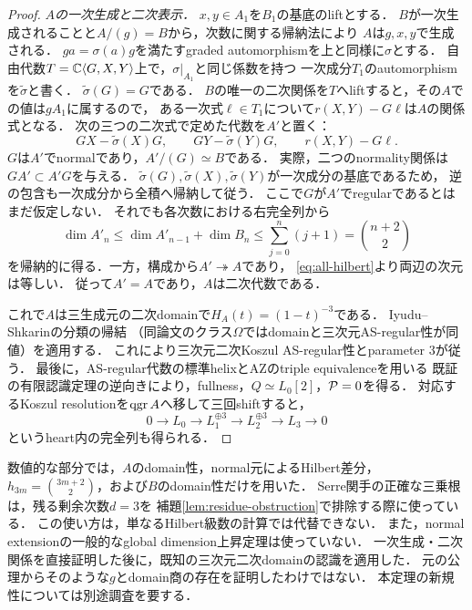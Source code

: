 \documentclass[11pt,a4paper]{ltjsarticle}
\begin{document}
\begin{proof}
\emph{$A$の一次生成と二次表示．}
$x,y\in A_1$を$B_1$の基底のliftとする．
$B$が一次生成されることと$A/(g)=B$から，次数に関する帰納法により
$A$は$g,x,y$で生成される．
$ga=\sigma(a)g$を満たすgraded automorphismを上と同様に$\sigma$とする．
自由代数$T=\mathbb C\langle G,X,Y\rangle$上で，$\sigma|_{A_1}$と同じ係数を持つ
一次成分$T_1$のautomorphismを$\widetilde\sigma$と書く．
$\widetilde\sigma(G)=G$である．
$B$の唯一の二次関係を$T$へliftすると，その$A$での値は$gA_1$に属するので，
ある一次式$\ell\in T_1$について$r(X,Y)-G\ell$は$A$の関係式となる．
次の三つの二次式で定めた代数を$A'$と置く：
\[
 GX-\widetilde\sigma(X)G,\qquad
 GY-\widetilde\sigma(Y)G,\qquad
 r(X,Y)-G\ell.
\]
$G$は$A'$でnormalであり，$A'/(G)\simeq B$である．
実際，二つのnormality関係は$GA'\subset A'G$を与える．
$\widetilde\sigma(G),\widetilde\sigma(X),\widetilde\sigma(Y)$が一次成分の基底であるため，
逆の包含も一次成分から全積へ帰納して従う．
ここで$G$が$A'$でregularであるとはまだ仮定しない．
それでも各次数における右完全列から
\[
 \dim A'_n\leq\dim A'_{n-1}+\dim B_n
 \leq\sum_{j=0}^n(j+1)=\binom{n+2}{2}
\]
を帰納的に得る．一方，構成から$A'\twoheadrightarrow A$であり，
\eqref{eq:all-hilbert}より両辺の次元は等しい．
従って$A'=A$であり，$A$は二次代数である．

これで$A$は三生成元の二次domainで$H_A(t)=(1-t)^{-3}$である．
Iyudu--Shkarin\cite[\S12.1, p.~78]{IS}の分類の帰結
（同論文のクラス$\Omega$ではdomainと三次元AS-regular性が同値）を適用する．
これにより三次元二次Koszul AS-regular性とparameter $3$が従う．
最後に，AS-regular代数の標準helixとAZのtriple equivalenceを用いる
既証の有限認識定理の逆向きにより，fullness，$Q\simeq L_0[2]$，$\mathcal P=0$を得る．
対応するKoszul resolutionを$\operatorname{qgr} A$へ移して三回shiftすると，
\[
 0\longrightarrow L_0\longrightarrow L_1^{\oplus3}
 \longrightarrow L_2^{\oplus3}\longrightarrow L_3\longrightarrow0
\]
というheart内の完全列も得られる．
\end{proof}

\begin{remark}[仮定・証明の依存関係]
数値的な部分では，$A$のdomain性，normal元によるHilbert差分，
$h_{3m}=\binom{3m+2}{2}$，および$B$のdomain性だけを用いた．
Serre関手の正確な三乗根は，残る剰余次数$d=3$を
補題\ref{lem:residue-obstruction}で排除する際に使っている．
この使い方は，単なるHilbert級数の計算では代替できない．
また，normal extensionの一般的なglobal dimension上昇定理は使っていない．
一次生成・二次関係を直接証明した後に，既知の三次元二次domainの認識を適用した．
元の公理からそのような$g$とdomain商の存在を証明したわけではない．
本定理の新規性については別途調査を要する．
\end{remark}
\end{document}
